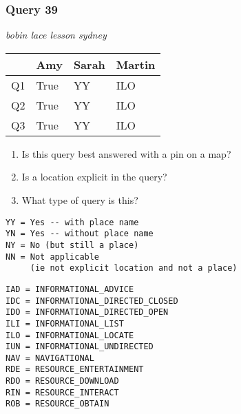 \begin{frame}[fragile]
\frametitle{Query 39}
\vspace{1em}

\emph{bobin lace lesson sydney}

\vfill

\begin{table}
  \centering
  \begin{tabular}{ l l l l }
    & \textbf{Amy} & \textbf{Sarah} & \textbf{Martin}\\
    \toprule
    Q1 & True & YY & ILO\\
Q2 & True & YY & ILO\\
Q3 & True & YY & ILO\\
    \bottomrule
  \end{tabular}
\end{table}

\vfill

\tiny{

\begin{enumerate}
\item Is this query best answered with a pin on a map?
\item Is a location explicit in the query?
\item What type of query is this?
\end{enumerate}

\vfill

\begin{multicols}{2}
\begin{verbatim}
YY = Yes -- with place name
YN = Yes -- without place name
NY = No (but still a place)
NN = Not applicable 
     (ie not explicit location and not a place)
\end{verbatim}

\columnbreak
\begin{verbatim}
IAD = INFORMATIONAL_ADVICE
IDC = INFORMATIONAL_DIRECTED_CLOSED
IDO = INFORMATIONAL_DIRECTED_OPEN
ILI = INFORMATIONAL_LIST
ILO = INFORMATIONAL_LOCATE
IUN = INFORMATIONAL_UNDIRECTED
NAV = NAVIGATIONAL
RDE = RESOURCE_ENTERTAINMENT
RDO = RESOURCE_DOWNLOAD
RIN = RESOURCE_INTERACT
ROB = RESOURCE_OBTAIN
\end{verbatim}
\end{multicols}
}

\end{frame}


